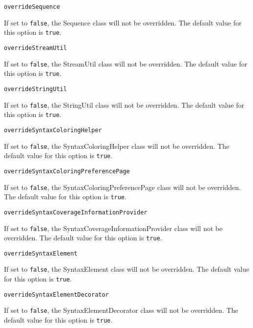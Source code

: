 \noindent\texttt{overrideSequence}
\begin{myindentpar}{1cm}
If set to \texttt{false}, the Sequence class will not be overridden. The default value for this option is \texttt{true}.
\end{myindentpar}

\noindent\texttt{overrideStreamUtil}
\begin{myindentpar}{1cm}
If set to \texttt{false}, the StreamUtil class will not be overridden. The default value for this option is \texttt{true}.
\end{myindentpar}

\noindent\texttt{overrideStringUtil}
\begin{myindentpar}{1cm}
If set to \texttt{false}, the StringUtil class will not be overridden. The default value for this option is \texttt{true}.
\end{myindentpar}

\noindent\texttt{overrideSyntaxColoringHelper}
\begin{myindentpar}{1cm}
If set to \texttt{false}, the SyntaxColoringHelper class will not be overridden. The default value for this option is \texttt{true}.
\end{myindentpar}

\noindent\texttt{overrideSyntaxColoringPreferencePage}
\begin{myindentpar}{1cm}
If set to \texttt{false}, the SyntaxColoringPreferencePage class will not be overridden. The default value for this option is \texttt{true}.
\end{myindentpar}

\noindent\texttt{overrideSyntaxCoverageInformationProvider}
\begin{myindentpar}{1cm}
If set to \texttt{false}, the SyntaxCoverageInformationProvider class will not be overridden. The default value for this option is \texttt{true}.
\end{myindentpar}

\noindent\texttt{overrideSyntaxElement}
\begin{myindentpar}{1cm}
If set to \texttt{false}, the SyntaxElement class will not be overridden. The default value for this option is \texttt{true}.
\end{myindentpar}

\noindent\texttt{overrideSyntaxElementDecorator}
\begin{myindentpar}{1cm}
If set to \texttt{false}, the SyntaxElementDecorator class will not be overridden. The default value for this option is \texttt{true}.
\end{myindentpar}

